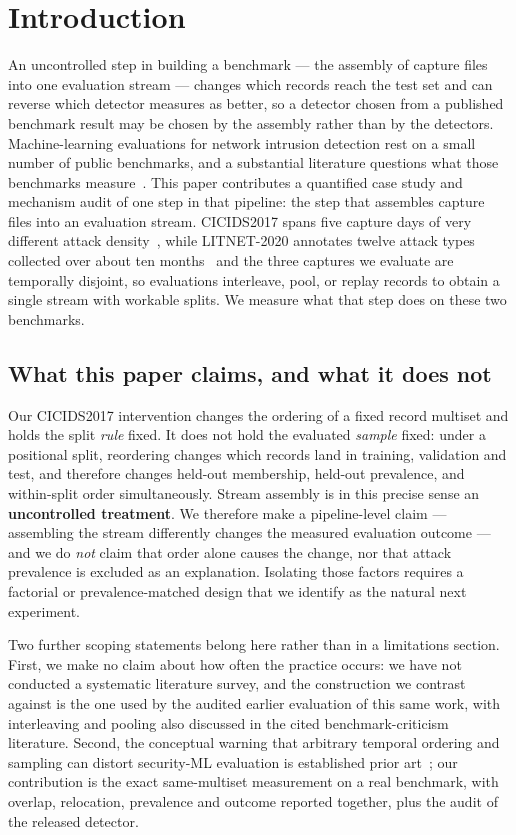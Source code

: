 \documentclass[manuscript,anonymous,review]{acmart}
\begin{document}
\section{Introduction}
\label{sec:intro}

An uncontrolled step in building a benchmark --- the assembly of capture files
into one evaluation stream --- changes which records reach the test set and can
reverse which detector measures as better, so a detector chosen from a published
benchmark result may be chosen by the assembly rather than by the detectors.
Machine-learning evaluations for network intrusion detection rest on a small
number of public benchmarks, and a substantial literature questions what those
benchmarks measure~\citep{catillo2023hype,arp2022dosdonts,ring2019datasets}.
This paper contributes a quantified case study and mechanism audit of one step
in that pipeline: the step that assembles capture files into an evaluation
stream. CICIDS2017 spans five capture days of very different attack
density~\citep{sharafaldin2018cicids,engelen2021cicids}, while LITNET-2020
annotates twelve attack types collected over about ten
months~\citep{damasevicius2020litnet} and the three captures we evaluate are
temporally disjoint, so evaluations
interleave, pool, or replay records to obtain a single stream with workable
splits. We measure what that step does on these two benchmarks.

\subsection*{What this paper claims, and what it does not}
Our CICIDS2017 intervention changes the ordering of a fixed record multiset and
holds the split \emph{rule} fixed. It does not hold the evaluated \emph{sample}
fixed: under a positional split, reordering changes which records land in
training, validation and test, and therefore changes held-out membership,
held-out prevalence, and within-split order simultaneously. Stream assembly is
in this precise sense an \textbf{uncontrolled treatment}. We therefore make a
pipeline-level claim --- assembling the stream differently changes the measured
evaluation outcome --- and we do \emph{not} claim that order alone causes the
change, nor that attack prevalence is excluded as an explanation. Isolating
those factors requires a factorial or prevalence-matched design that we
identify as the natural next experiment.

Two further scoping statements belong here rather than in a limitations
section. First, we make no claim about how often the practice occurs: we have
not conducted a systematic literature survey, and the construction we contrast
against is the one used by the audited earlier evaluation of this same work,
with interleaving and pooling also discussed in the cited benchmark-criticism
literature. Second, the conceptual warning that arbitrary temporal ordering and
sampling can distort security-ML evaluation is established prior
art~\citep{catillo2023hype,arp2022dosdonts}; our contribution is the exact
same-multiset measurement on a real benchmark, with overlap, relocation,
prevalence and outcome reported together, plus the audit of the released
detector.
\end{document}
